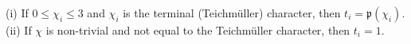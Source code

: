 (i) If $0 \leq \chi_i \leq 3$ and $\chi_i$ is the terminal (Teichm\"uller) character, then $t_i = \mathfrak{p}(\chi_i)$.
(ii) If $\chi$ is non-trivial and not equal to the Teichm\"uller character, then $t_i = 1$.
